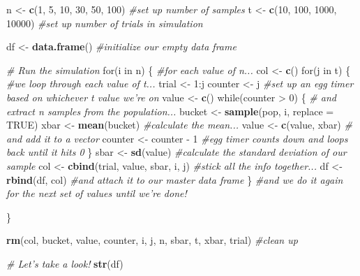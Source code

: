 \documentclass[]{article}
\newenvironment{Shaded}{\begin{snugshade}}{\end{snugshade}}
\newcommand{\KeywordTok}[1]{\textcolor[rgb]{0.13,0.29,0.53}{\textbf{{#1}}}}
\newcommand{\DataTypeTok}[1]{\textcolor[rgb]{0.13,0.29,0.53}{{#1}}}
\newcommand{\DecValTok}[1]{\textcolor[rgb]{0.00,0.00,0.81}{{#1}}}
\newcommand{\StringTok}[1]{\textcolor[rgb]{0.31,0.60,0.02}{{#1}}}
\newcommand{\CommentTok}[1]{\textcolor[rgb]{0.56,0.35,0.01}{\textit{{#1}}}}
\newcommand{\OtherTok}[1]{\textcolor[rgb]{0.56,0.35,0.01}{{#1}}}
\newcommand{\NormalTok}[1]{{#1}}
\begin{document}
\begin{Shaded}
\begin{Highlighting}[]
\NormalTok{n <-}\StringTok{ }\KeywordTok{c}\NormalTok{(}\DecValTok{1}\NormalTok{, }\DecValTok{5}\NormalTok{, }\DecValTok{10}\NormalTok{, }\DecValTok{30}\NormalTok{, }\DecValTok{50}\NormalTok{, }\DecValTok{100}\NormalTok{) }\CommentTok{#set up number of samples}
\NormalTok{t <-}\StringTok{ }\KeywordTok{c}\NormalTok{(}\DecValTok{10}\NormalTok{, }\DecValTok{100}\NormalTok{, }\DecValTok{1000}\NormalTok{, }\DecValTok{10000}\NormalTok{) }\CommentTok{#set up number of trials in simulation}

\NormalTok{df <-}\StringTok{ }\KeywordTok{data.frame}\NormalTok{() }\CommentTok{#initialize our empty data frame}

\CommentTok{# Run the simulation}
\NormalTok{for(i in n) \{ }\CommentTok{#for each value of n...}
    \NormalTok{col <-}\StringTok{ }\KeywordTok{c}\NormalTok{()}
    \NormalTok{for(j in t) \{ }\CommentTok{#we loop through each value of t...}
        \NormalTok{trial <-}\StringTok{ }\DecValTok{1}\NormalTok{:j}
        \NormalTok{counter <-}\StringTok{ }\NormalTok{j }\CommentTok{#set up an egg timer based on whichever t value we're on}
        \NormalTok{value <-}\StringTok{ }\KeywordTok{c}\NormalTok{()}
        \NormalTok{while(counter >}\StringTok{ }\DecValTok{0}\NormalTok{) \{    }\CommentTok{# and extract n samples from the population...}
            \NormalTok{bucket <-}\StringTok{ }\KeywordTok{sample}\NormalTok{(pop, i, }\DataTypeTok{replace =} \OtherTok{TRUE}\NormalTok{)}
            \NormalTok{xbar <-}\StringTok{ }\KeywordTok{mean}\NormalTok{(bucket) }\CommentTok{#calculate the mean...}
            \NormalTok{value <-}\StringTok{ }\KeywordTok{c}\NormalTok{(value, xbar) }\CommentTok{# and add it to a vector}
            \NormalTok{counter <-}\StringTok{ }\NormalTok{counter -}\StringTok{ }\DecValTok{1} \CommentTok{#egg timer counts down and loops back until it hits 0}
        \NormalTok{\}}
        \NormalTok{sbar <-}\StringTok{ }\KeywordTok{sd}\NormalTok{(value) }\CommentTok{#calculate the standard deviation of our sample}
        \NormalTok{col <-}\StringTok{ }\KeywordTok{cbind}\NormalTok{(trial, value, sbar, i, j) }\CommentTok{#stick all the info together...}
        \NormalTok{df <-}\StringTok{ }\KeywordTok{rbind}\NormalTok{(df, col) }\CommentTok{#and attach it to our master data frame}
    \NormalTok{\} }\CommentTok{#and we do it again for the next set of values until we're done!}
    
\NormalTok{\}}

\KeywordTok{rm}\NormalTok{(col, bucket, value, counter, i, j, n, sbar, t, xbar, trial) }\CommentTok{#clean up}

\CommentTok{# Let's take a look!}
\KeywordTok{str}\NormalTok{(df)}
\end{Highlighting}
\end{Shaded}
\end{document}
